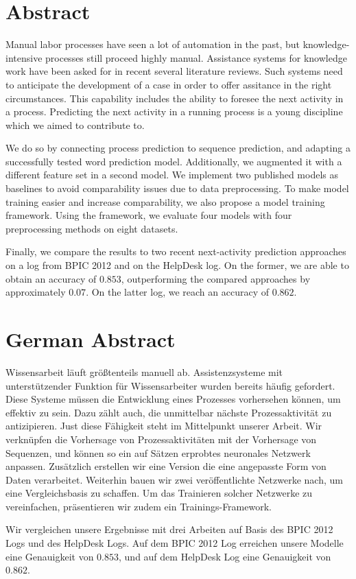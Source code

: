 


\begingroup
\let\clearpage\relax
\let\cleardoublepage\relax
\let\cleardoublepage\relax

\chapter*{Abstract}
Manual labor processes have seen a lot of automation in the past, but knowledge-intensive processes still proceed highly manual.
Assistance systems for knowledge work have been asked for in recent several literature reviews.
Such systems need to anticipate the development of a case in order to offer assitance in the right circumstances.
This capability includes the ability to foresee the next activity in a process.
Predicting the next activity in a running process is a young discipline which we aimed to contribute to.

We do so by connecting process prediction to sequence prediction, and adapting a successfully tested word prediction model.
Additionally, we augmented it with a different feature set in a second model.
We implement two published models as baselines to avoid comparability issues due to data preprocessing.
To make model training easier and increase comparability, we also propose a model training framework.
Using the framework, we evaluate four models with four preprocessing methods on eight datasets.

Finally, we compare the results to two recent next-activity prediction approaches on a log from BPIC 2012 and on the HelpDesk log.
On the former, we are able to obtain an accuracy of $0.853$, outperforming the compared approaches by approximately $0.07$.
On the latter log, we reach an accuracy of $0.862$.

\chapter*{German Abstract}
Wissensarbeit läuft größtenteils manuell ab.
Assistenzsysteme mit unterstützender Funktion für Wissensarbeiter wurden bereits häufig gefordert.
Diese Systeme müssen die Entwicklung eines Prozesses vorhersehen können, um effektiv zu sein.
Dazu zählt auch, die unmittelbar nächste Prozessaktivität zu antizipieren.
Just diese Fähigkeit steht im Mittelpunkt unserer Arbeit.
Wir verknüpfen die Vorhersage von Prozessaktivitäten mit der Vorhersage von Sequenzen, und können so ein auf Sätzen erprobtes neuronales Netzwerk anpassen.
Zusätzlich erstellen wir eine Version die eine angepasste Form von Daten verarbeitet.
Weiterhin bauen wir zwei veröffentlichte Netzwerke nach, um eine Vergleichsbasis zu schaffen.
Um das Trainieren solcher Netzwerke zu vereinfachen, präsentieren wir zudem ein Trainings-Framework.

Wir vergleichen unsere Ergebnisse mit drei Arbeiten auf Basis des BPIC 2012 Logs und des HelpDesk Logs.
Auf dem BPIC 2012 Log erreichen unsere Modelle eine Genauigkeit von $0.853$, und auf dem HelpDesk Log eine Genauigkeit von $0.862$.

\endgroup

\vfill
